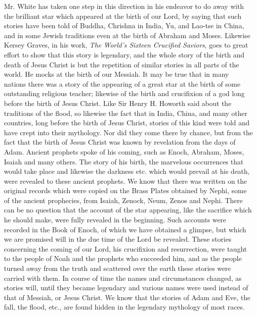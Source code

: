 Mr. White has taken one step in this direction in his endeavor to do away with the brilliant
star which appeared at the birth of our Lord, by saying that such stories have been told of
Buddha, Chrishna in India, Yu, and Lao-tse in China, and in some Jewish traditions even at
the birth of Abraham and Moses. Likewise Kersey Graves, in his work, \textit{The World's Sixteen
Crucified Saviors}, goes to great effort to show that this story is legendary, and the whole
story of the birth and death of Jesus Christ is but the repetition of similar stories in all parts of
the world. He mocks at the birth of our Messiah. It may be true that in many nations there
was a story of the appearing of a great star at the birth of some outstanding religious teacher;
likewise of the birth and crucifixion of a god long before the birth of Jesus Christ. Like Sir
Henry H. Howorth said about the traditions of the flood, so likewise the fact that in India,
China, and many other countries, long before the birth of Jesus Christ, stories of this kind
were told and have crept into their mythology. Nor did they come there by chance, but from
the fact that the birth of Jesus Christ was known by revelation from the days of Adam.
Ancient prophets spoke of his coming, such as Enoch, Abraham, Moses, Isaiah and many
others. The story of his birth, the marvelous occurrences that would take place and likewise
the darkness etc. which would prevail at his death, were revealed to these ancient prophets.
We know that there was written on the original records which were copied on the Brass
Plates obtained by Nephi, some of the ancient prophecies, from Isaiah, Zenock, Neum, Zenos
and Nephi. There can be no question that the account of the star appearing, like the sacrifice
which he should make, were fully revealed in the beginning. Such accounts were recorded in
the Book of Enoch, of which we have obtained a glimpse, but which we are promised will in
the due time of the Lord be revealed. These stories concerning the coming of our Lord, his
crucifixion and resurrection, were taught to the people of Noah and the prophets who
succeeded him, and as the people turned away from the truth and scattered over the earth
these stories were carried with them. In course of time the names and circumstances changed,
as stories will, until they became legendary and various names were used instead of that of
Messiah, or Jesus Christ. We know that the stories of Adam and Eve, the fall, the flood, etc.,
are found hidden in the legendary mythology of most races.

